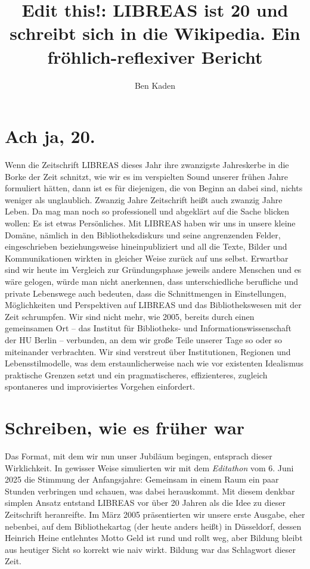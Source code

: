 \documentclass[a4paper,
fontsize=11pt,
oneside,
numbers=noperiodatend,
parskip=half-,
bibliography=totoc,
final
]{scrartcl}
\title{\LARGE{Edit this!: LIBREAS ist 20 und schreibt sich in die Wikipedia. Ein fröhlich-reflexiver Bericht}}%
\author{Ben Kaden} %
\date{}
\begin{document}
\maketitle
\thispagestyle{fancyplain} 


\section{Ach ja, 20.}\label{ach-ja-20.}

Wenn die Zeitschrift LIBREAS dieses Jahr ihre zwanzigste Jahreskerbe in
die Borke der Zeit schnitzt, wie wir es im verspielten Sound unserer
frühen Jahre formuliert hätten, dann ist es für diejenigen, die von
Beginn an dabei sind, nichts weniger als unglaublich. Zwanzig Jahre
Zeitschrift heißt auch zwanzig Jahre Leben. Da mag man noch so
professionell und abgeklärt auf die Sache blicken wollen: Es ist etwas
Persönliches. Mit LIBREAS haben wir uns in unsere kleine Domäne, nämlich
in den Bibliotheksdiskurs und seine angrenzenden Felder, eingeschrieben
beziehungsweise hineinpubliziert und all die Texte, Bilder und
Kommunikationen wirkten in gleicher Weise zurück auf uns selbst.
Erwartbar sind wir heute im Vergleich zur Gründungsphase jeweils andere
Menschen und es wäre gelogen, würde man nicht anerkennen, dass
unterschiedliche berufliche und private Lebenswege auch bedeuten, dass
die Schnittmengen in Einstellungen, Möglichkeiten und Perspektiven auf
LIBREAS und das Bibliothekswesen mit der Zeit schrumpfen. Wir sind nicht
mehr, wie 2005, bereits durch einen gemeinsamen Ort -- das Institut für
Bibliotheks- und Informationswissenschaft der HU Berlin -- verbunden, an
dem wir große Teile unserer Tage so oder so miteinander verbrachten. Wir
sind verstreut über Institutionen, Regionen und Lebensstilmodelle, was
dem erstaunlicherweise nach wie vor existenten Idealismus praktische
Grenzen setzt und ein pragmatischeres, effizienteres, zugleich
spontaneres und improvisiertes Vorgehen einfordert.

\section{Schreiben, wie es früher
war}\label{schreiben-wie-es-fruxfcher-war}

Das Format, mit dem wir nun unser Jubiläum begingen, entsprach dieser
Wirklichkeit. In gewisser Weise simulierten wir mit dem \emph{Editathon}
vom 6. Juni 2025 die Stimmung der Anfangsjahre: Gemeinsam in einem Raum
ein paar Stunden verbringen und schauen, was dabei herauskommt. Mit
diesem denkbar simplen Ansatz entstand LIBREAS vor über 20 Jahren als
die Idee zu dieser Zeitschrift heranreifte. Im März 2005 präsentierten
wir unsere erste Ausgabe, eher nebenbei, auf dem Bibliothekartag (der
heute anders heißt) in Düsseldorf, dessen Heinrich Heine entlehntes
Motto \textquotesingle Geld ist rund und rollt weg, aber Bildung
bleibt\textquotesingle{} aus heutiger Sicht so korrekt wie naiv wirkt.
Bildung war das Schlagwort dieser Zeit.
\end{document}
